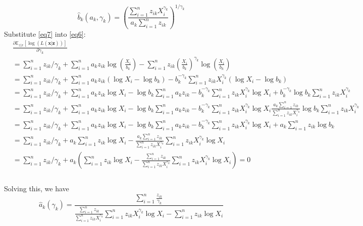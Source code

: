 \documentclass[
  letterpaper,
  DIV=11,
  numbers=noendperiod,
  oneside]{scrreprt}
\begin{document}
\begin{equation} \label{eq7}
    \hat b_k(a_k,{\gamma_k})=\left(\frac{\displaystyle\sum^{n}_{i=1}z_{ik}X_i^{\gamma_k}}{a_k\displaystyle\sum^{n}_{i=1}z_{ik}}\right)^{1/{\gamma_k}}
\end{equation} Substitute \eqref{eq7} into \eqref{eq6}: \begin{align*}
    &\frac{\partial \mathbb E_{z|x}[\log(L(\mathbf{x}|\mathbf{z}))]}{\partial {\gamma_k}}\\
    &=\sum^{n}_{i=1}z_{ik}/{\gamma_k}+\sum^{n}_{i=1}a_kz_{ik}\log(\frac{X_i}{b_k})-\sum^{n}_{i=1}z_{ik}(\frac{X_i}{b_k}) ^{\gamma_k} \log(\frac{X_i}{b_k})\\
    &=\sum^{n}_{i=1}z_{ik}/{\gamma_k}+\sum^{n}_{i=1}a_kz_{ik}(\log X_i-\log b_k)-b_k^{-{\gamma_k}}\sum^{n}_{i=1}z_{ik}X_i ^{\gamma_k} (\log X_i-\log b_k)\\
    &=\sum^{n}_{i=1}z_{ik}/{\gamma_k}+\sum^{n}_{i=1}a_kz_{ik}\log X_i-\log b_k\sum^{n}_{i=1}a_kz_{ik}-b_k^{-{\gamma_k}}\sum^{n}_{i=1}z_{ik}X_i ^{\gamma_k} \log X_i+b_k^{-{\gamma_k}}\log b_k\sum^{n}_{i=1}z_{ik}X_i ^{\gamma_k}\\
    &=\sum^{n}_{i=1}z_{ik}/{\gamma_k}+\sum^{n}_{i=1}a_kz_{ik}\log X_i-\log b_k\sum^{n}_{i=1}a_kz_{ik}-b_k^{-{\gamma_k}}\sum^{n}_{i=1}z_{ik}X_i ^{\gamma_k} \log X_i
    \frac {a_k\displaystyle\sum^{n}_{i=1}z_{ik}}{\displaystyle\sum^{n}_{i=1}z_{ik}X_i^{\gamma_k}} \log b_k\displaystyle\sum^{n}_{i=1}z_{ik}X_i ^{\gamma_k}\\
    &=\sum^{n}_{i=1}z_{ik}/{\gamma_k}+\sum^{n}_{i=1}a_kz_{ik}\log X_i-\log b_k\sum^{n}_{i=1}a_kz_{ik}-b_k^{-{\gamma_k}}\sum^{n}_{i=1}z_{ik}X_i ^{\gamma_k} \log X_i+{a_k\sum^{n}_{i=1}z_{ik}}\log b_k\\
    &=\sum^{n}_{i=1}z_{ik}/{\gamma_k}+a_k\sum^{n}_{i=1}z_{ik}\log X_i-\frac {a_k\displaystyle\sum^{n}_{i=1}z_{ik}}{\displaystyle\sum^{n}_{i=1}z_{ik}X_i^{\gamma_k}}\sum^{n}_{i=1}z_{ik}X_i ^{\gamma_k} \log X_i\\
    &=\sum^{n}_{i=1}z_{ik}/{\gamma_k}+a_k\left(\sum^{n}_{i=1}z_{ik}\log X_i-\frac {\displaystyle\sum^{n}_{i=1}z_{ik}}{\displaystyle\sum^{n}_{i=1}z_{ik}X_i^{\gamma_k}}\sum^{n}_{i=1}z_{ik}X_i ^{\gamma_k} \log X_i\right)=0\\
\end{align*}\\
Solving this, we have \begin{equation} \label{eq8}
      \hat a_k ({\gamma_k})=\displaystyle\frac{\displaystyle\sum^{n}_{i=1}\displaystyle\frac{z_{ik}}{{\gamma_k}}}
      {\displaystyle\frac{\displaystyle\sum^{n}_{i=1}z_{ik}}{\displaystyle\sum^{n}_{i=1}z_{ik}X_i^{\gamma_k}}\sum^{n}_{i=1}z_{ik}X_i ^{\gamma_k} \log X_i-\sum^{n}_{i=1}z_{ik}\log X_i}
  \end{equation}
\end{document}
